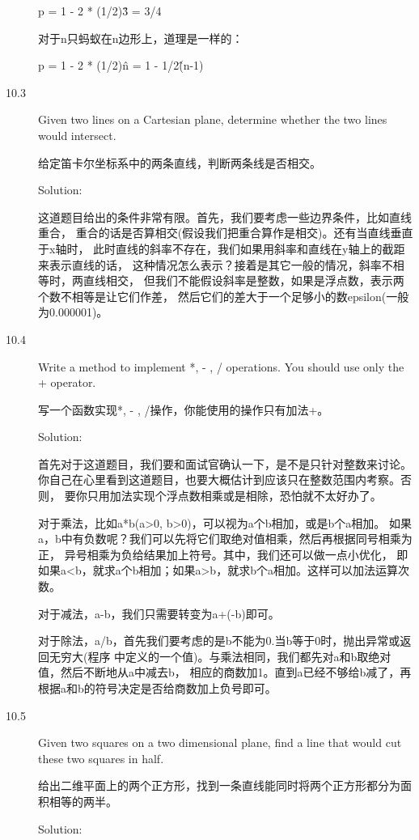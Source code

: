 \begin{description}
p = 1 - 2 * (1/2)\^3 = 3/4

对于n只蚂蚁在n边形上，道理是一样的：

p = 1 - 2 * (1/2)\^n = 1 - 1/2\^(n-1)


\item[10.3] Given two lines on a Cartesian plane, determine whether the two lines would intersect.

给定笛卡尔坐标系中的两条直线，判断两条线是否相交。

Solution: 

这道题目给出的条件非常有限。首先，我们要考虑一些边界条件，比如直线重合， 重合的话是否算相交(假设我们把重合算作是相交)。还有当直线垂直于x轴时， 此时直线的斜率不存在，我们如果用斜率和直线在y轴上的截距来表示直线的话， 这种情况怎么表示？接着是其它一般的情况，斜率不相等时，两直线相交， 但我们不能假设斜率是整数，如果是浮点数，表示两个数不相等是让它们作差， 然后它们的差大于一个足够小的数epsilon(一般为0.000001)。


\item[10.4] Write a method to implement *, - , / operations. You should use only the + operator.

写一个函数实现*, - , /操作，你能使用的操作只有加法+。

Solution: 

首先对于这道题目，我们要和面试官确认一下，是不是只针对整数来讨论。 你自己在心里看到这道题目，也要大概估计到应该只在整数范围内考察。否则， 要你只用加法实现个浮点数相乘或是相除，恐怕就不太好办了。

对于乘法，比如a*b(a>0, b>0)，可以视为a个b相加，或是b个a相加。 如果a，b中有负数呢？我们可以先将它们取绝对值相乘，然后再根据同号相乘为正， 异号相乘为负给结果加上符号。其中，我们还可以做一点小优化， 即如果a<b，就求a个b相加；如果a>b，就求b个a相加。这样可以加法运算次数。

对于减法，a-b，我们只需要转变为a+(-b)即可。

对于除法，a/b，首先我们要考虑的是b不能为0.当b等于0时，抛出异常或返回无穷大(程序 中定义的一个值)。与乘法相同，我们都先对a和b取绝对值，然后不断地从a中减去b， 相应的商数加1。直到a已经不够给b减了，再根据a和b的符号决定是否给商数加上负号即可。



\item[10.5] Given two squares on a two dimensional plane, find a line that would cut these two squares in half.

给出二维平面上的两个正方形，找到一条直线能同时将两个正方形都分为面积相等的两半。

Solution: 


\end{description}
